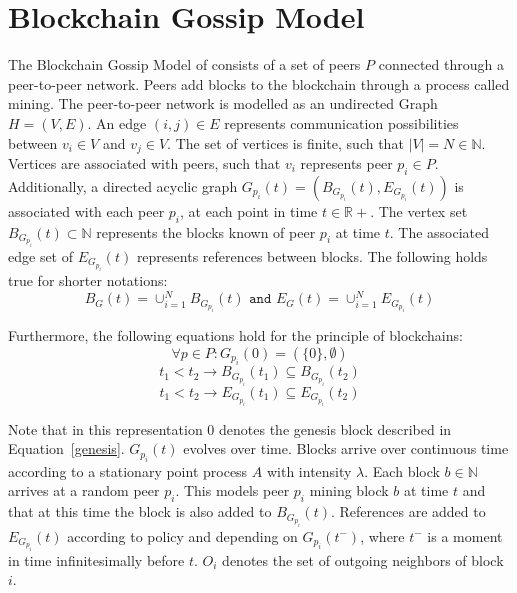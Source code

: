 \section{Blockchain Gossip Model}\label{gopalan}
The Blockchain Gossip Model of \citeauthor{gopalan} consists of a set of peers $P$ connected through a peer-to-peer network. Peers add blocks to the blockchain through a process called mining. 
The peer-to-peer network is modelled as an undirected Graph $H = (V,E)$.
An edge $(i,j) \in E$ represents communication possibilities between $v_i \in V$ and $v_j \in V$. 
The set of vertices is finite, such that $|V|=N \in \mathbb{N}$.
Vertices are associated with peers, such that $v_i$ represents peer $p_i \in P$.
Additionally, a directed acyclic graph $G_{p_i}(t) = (B_{G_{p_i}}(t),E_{G_{p_i}}(t))$ is associated with each peer $p_i$, at each point in time $t \in \mathbb{R+}$.
The vertex set $B_{G_{p_i}}(t) \subset \mathbb{N}$ represents the blocks known of peer $p_i$ at time $t$. The associated edge set of $E_{G_{p_i}}(t)$ represents references between blocks.
The following holds true for shorter notations:
\begin{equation}
B_G(t) = \cup_{i=1}^N B_{G_{p_i}}(t) \texttt{ and } E_G(t) = \cup_{i=1}^N E_{G_{p_i}}(t)
\label{unisondef}
\end{equation}

Furthermore, the following equations hold for the principle of blockchains:
\begin{equation}
\forall p \in P: G_{p_i}(0) = (\{0\},\emptyset)
\label{genesis}
\end{equation}
\begin{equation}
t_1 < t_2 \rightarrow B_{G_{p_i}}(t_1) \subseteq B_{G_{p_i}}(t_2)
\label{nodegrow}
\end{equation}
\begin{equation}
t_1 < t_2 \rightarrow E_{G_{p_i}}(t_1) \subseteq E_{G_{p_i}}(t_2)
\label{edgegrow}
\end{equation}

Note that in this representation $0$ denotes the genesis block described in Equation~\ref{genesis}.
$G_{p_i}(t)$ evolves over time. Blocks arrive over continuous time according to a stationary point process $A$ with intensity $\lambda$. Each block $b \in \mathbb{N}$ arrives at a random peer $p_i$.
This models peer $p_i$ mining block $b$ at time $t$ and that at this time the block is also added to $B_{G_{p_i}}(t)$.
References are added to $E_{G_{p_i}}(t)$ according to policy and depending on $G_{p_i}(t^-)$, where $t^-$ is a moment in time infinitesimally before $t$. $O_i$ denotes the set of outgoing neighbors of block $i$.

